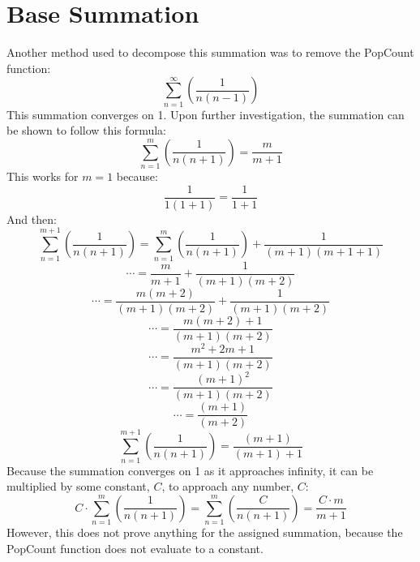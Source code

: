 \documentclass{article}
\begin{document}
\section{Base Summation}
Another method used to decompose this summation was to remove the PopCount function:
$$\sum_{n=1}^\infty \left( \frac{1}{n(n-1)} \right)$$
This summation converges on 1. Upon further investigation, the summation can be shown to follow this formula:
$$\sum_{n=1}^m \left( \frac{1}{n(n+1)} \right) = \frac{m}{m+1}$$
This works for $m=1$ because:
$$\frac{1}{1(1+1)}=\frac{1}{1+1}$$
And then:
$$\sum_{n=1}^{m+1} \left( \frac{1}{n(n+1)} \right) = \sum_{n=1}^{m} \left( \frac{1}{n(n+1)} \right) + \frac{1}{(m+1)(m+1+1)}$$
$$\cdots = \frac{m}{m+1} + \frac{1}{(m+1)(m+2)}$$
$$\cdots = \frac{m(m+2)}{(m+1)(m+2)} + \frac{1}{(m+1)(m+2)}$$
$$\cdots = \frac{m(m+2) + 1}{(m+1)(m+2)}$$
$$\cdots = \frac{m^2+2m+1}{(m+1)(m+2)}$$
$$\cdots = \frac{(m+1)^2}{(m+1)(m+2)}$$
$$\cdots = \frac{(m+1)}{(m+2)}$$
$$\sum_{n=1}^{m+1} \left( \frac{1}{n(n+1)} \right) = \frac{(m+1)}{(m+1)+1}$$
Because the summation converges on 1 as it approaches infinity, it can be multiplied by some constant, $C$, to approach any number, $C$:
$$C\cdot\sum_{n=1}^m \left( \frac{1}{n(n+1)} \right) = \sum_{n=1}^m \left( \frac{C}{n(n+1)} \right) = \frac{C \cdot m}{m+1}$$
However, this does not prove anything for the assigned summation, because the PopCount function does not evaluate to a constant.
\end{document}
